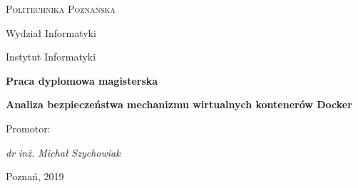 \begin{titlepage}
    \centering
        \scshape
    	    \LARGE{Politechnika Poznańska}\par
    	    \vspace{0.5cm}
    	    \Large{Wydział Informatyki}\par
    	    \vspace{0.5cm}
    	    \large{Instytut Informatyki}\par
    	\upshape
        \vspace{1cm}
        \large\textbf{Praca dyplomowa magisterska}\par
        \vspace{2cm}
        \huge\textbf{Analiza bezpieczeństwa mechanizmu wirtualnych kontenerów Docker}\par
        \vspace{1cm}
        \makeatletter
        \Large\textit{\@author}\par
        \makeatother
	\vfill
	
	\raggedleft
	    \Large\textmd{Promotor:}\par
	    \Large\textit{dr inż. Michał Szychowiak}\par
	\vspace{2cm}
	
	\centering
	\normalsize{Poznań, 2019}
\end{titlepage}
